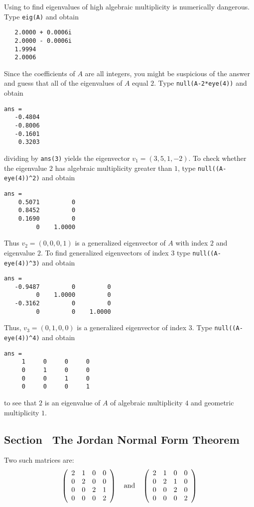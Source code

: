 \soln Using \Matlab to find eigenvalues of high algebraic multiplicity is numerically
dangerous. Type {\tt eig(A)} and obtain
\begin{verbatim}
   2.0000 + 0.0006i
   2.0000 - 0.0006i
   1.9994          
   2.0006          
\end{verbatim}
Since the coefficients of $A$ are all integers, you might be suspicious of the answer
and guess that all of the eigenvalues of $A$ equal $2$.  Type {\tt null(A-2*eye(4))}
and obtain
\begin{verbatim}
ans =
   -0.4804
   -0.8006
   -0.1601
    0.3203
\end{verbatim}
dividing by {\tt ans(3)} yields the eigenvector $v_1=(3,5,1,-2)$.  To check whether
the eigenvalue $2$ has algebraic multiplicity greater than $1$, type 
{\tt null((A-eye(4))\^{}2)} and obtain
\begin{verbatim}
ans =
    0.5071         0
    0.8452         0
    0.1690         0
         0    1.0000
\end{verbatim}
Thus $v_2=(0,0,0,1)$ is a generalized eigenvector of $A$ with index $2$ and eigenvalue
$2$.  To find generalized eigenvectors of index $3$ type {\tt null((A-eye(4))\^{}3)} 
and obtain
\begin{verbatim}
ans =
   -0.9487         0         0
         0    1.0000         0
   -0.3162         0         0
         0         0    1.0000
\end{verbatim}
Thus, $v_3=(0,1,0,0)$ is a generalized eigenvector of index $3$.  Type 
{\tt null((A-eye(4))\^{}4)} and obtain
\begin{verbatim}
ans =
     1     0     0     0
     0     1     0     0
     0     0     1     0
     0     0     0     1
\end{verbatim}
to see that $2$ is an eigenvalue of $A$ of algebraic multiplicity $4$ and geometric
multiplicity $1$.  



\subsection*{Section~\protect{\ref{S:JNF}} The Jordan Normal Form Theorem}

\ans Two such matrices are:
\[
\left(\begin{array}{rrrr}
2 & 1 & 0 & 0 \\
0 & 2 & 0 & 0 \\
0 & 0 & 2 & 1 \\
0 & 0 & 0 & 2 \end{array}\right)
\quad\mbox{and}\quad
\left(\begin{array}{rrrr}
2 & 1 & 0 & 0 \\
0 & 2 & 1 & 0 \\
0 & 0 & 2 & 0 \\
0 & 0 & 0 & 2 \end{array}\right)
\]

